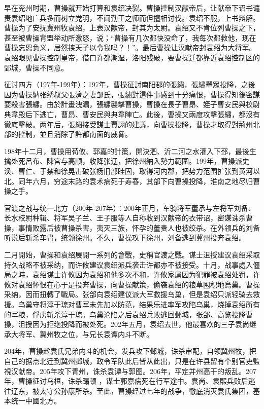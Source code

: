 早在兖州时期，曹操就开始打算和袁绍决裂。曹操控制汉献帝后，让献帝下诏书谴责袁绍地广兵多而树立党羽，不闻勤王之师而但擅相讨伐。袁绍不服，上书辩解。曹操为了安抚冀州牧袁绍，上表汉献帝，封其为太尉。袁绍又不肯位列曹操之下，甚至被曹操背盟举动所激怒，说；“曹操有几次都快没命了，我每次都救他，现在曹操忘恩负义，居然挟天子以令我吗？！”。最后曹操让汉献帝封袁绍为大将军。袁绍眼见曹操控制皇帝，借口许都潮湿，洛阳残破，要曹操迁都靠近袁绍控制区的鄄城，曹操不同意。

征讨四方（197年-199年）：197年，曹操征討南阳郡的張繡，張繡舉眾投降，之後因为曹操納张绣叔父張濟之妻邹氏，張繡對這件事感到十分痛恨，曹操得知後密謀要殺害張繡。由於計畫洩漏，張繡襲擊曹操，曹操在長子曹昂、姪子曹安民與校尉典韋殿后下逃亡，曹昂、曹安民與典韋陣亡。此後，曹操又兩度攻擊張繡，都沒有徹底擊破。两年后，張繡接受謀士賈詡的建議，向曹操投降，曹操才取得對荊州北部的控制，並且消除了許都南面的威脅。

198年十二月，曹操用荀攸、郭嘉的計策，開決泗、沂二河之水灌入下邳，最後生擒处死呂布、陳宮与高顺，收降张辽，把徐州納入勢力範圍。199年，曹操派史涣、曹仁、于禁和徐晃击破张杨旧部眭固，取得河内郡，把势力范围扩张到黄河以北。同年六月，穷途末路的袁术病死于寿春，其部下向曹操投降，淮南之地尽归曹操之手。

官渡之战与统一北方（200年-207年）：200年正月，车骑将军董承与左将军刘备、长水校尉种辑、将军吴子兰、王子服等人自称收到汉献帝的衣带诏，密谋诛杀曹操，事情败露后被曹操杀害，夷灭三族，怀孕的董贵人也被绞杀。在外领兵的刘备听说后斩杀车胄，统领徐州。不久，曹操攻下徐州，刘备逃到冀州投奔袁绍。

二月開始，曹操和袁绍展開一系列的會戰，史稱官渡之戰。谋士沮授建议袁绍采取持久战略不被采纳，而许攸建议袁绍派兵袭击许都亦不被接受。十月，战事處入僵局之時，袁绍谋士许攸因为袁绍和他多次不和，许攸家属因为犯罪被袁绍处罚，许攸对袁绍怀恨在心于是投奔曹操，向曹操献策，偷袭袁绍的粮草囤积地烏巢。曹操采纳，因而扭轉了戰局。张郃向袁绍建议派大军救援乌巢，但是袁绍只派轻骑去救援。乌巢守将淳于琼对曹军未先加以防范，结果乐进率军攻陷乌巢，烧掉袁绍所有的军粮，俘虏斩杀淳于琼。乌巢沦陷之后袁绍兵败逃回邺城，张郃、高览投降曹操，沮授因为拒绝投降而被处死。202年五月，袁绍去世，他最喜欢的三子袁尚继承大将军、冀州牧之位，与兄长袁谭内斗不断。

204年，曹操趁袁氏兄弟内斗的机会，发兵攻下邺城，诛杀审配，自领冀州牧，把自己的据点北迁到冀州邺城，政令军队此后皆从此出，只是在许县留有个别官吏監視汉献帝。205年攻下青州，诛杀袁谭与郭图。206年，平定并州高干的叛乱。207年，曹操征讨乌桓，诛杀蹋顿 ，谋士郭嘉病死在行军途中。袁尚、袁熙兵败后逃往辽东，被太守公孙康所杀。至此，曹操经过七年的战争，徹底消灭袁氏集团，基本统一中國北方。

